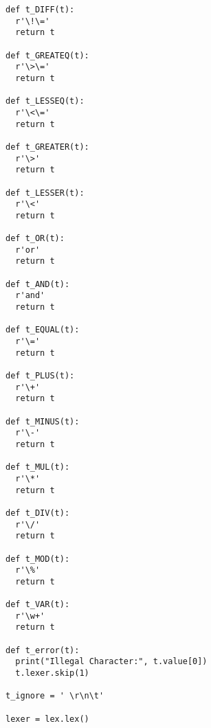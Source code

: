 \documentclass[11pt,a4paper]{report}%
\begin{document}
\begin{scriptsize}
\begin{verbatim}
def t_DIFF(t):
  r'\!\='
  return t

def t_GREATEQ(t):
  r'\>\='
  return t

def t_LESSEQ(t):
  r'\<\='
  return t

def t_GREATER(t):
  r'\>'
  return t

def t_LESSER(t):
  r'\<'
  return t

def t_OR(t):
  r'or'
  return t

def t_AND(t):
  r'and'
  return t

def t_EQUAL(t):
  r'\='
  return t

def t_PLUS(t):
  r'\+'
  return t

def t_MINUS(t):
  r'\-'
  return t

def t_MUL(t):
  r'\*'
  return t

def t_DIV(t):
  r'\/'
  return t

def t_MOD(t):
  r'\%'
  return t

def t_VAR(t):
  r'\w+'
  return t

def t_error(t):
  print("Illegal Character:", t.value[0])
  t.lexer.skip(1)

t_ignore = ' \r\n\t'

lexer = lex.lex()

\end{verbatim}
\end{scriptsize}
\end{document}
